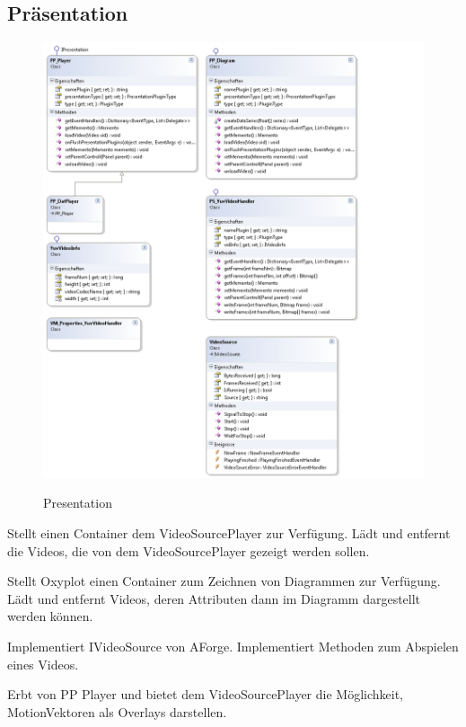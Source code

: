 \subsection{Präsentation}
\begin{figure}[h]
\noindent\includegraphics[width=\linewidth,height=\textheight,
keepaspectratio]{bilder/Klassendiagramm/Plugins1.png}
\label{}
\caption{Presentation}
\end{figure}

Stellt einen Container dem VideoSourcePlayer zur Verfügung. Lädt und entfernt die Videos, die von dem VideoSourcePlayer gezeigt werden sollen.


Stellt Oxyplot einen Container zum Zeichnen von Diagrammen zur Verfügung. Lädt und entfernt Videos, deren Attributen dann im Diagramm dargestellt werden können.


Implementiert IVideoSource von AForge. Implementiert Methoden zum Abspielen eines Videos.


Erbt von PP Player und bietet dem VideoSourcePlayer die Möglichkeit, MotionVektoren als Overlays darstellen.



